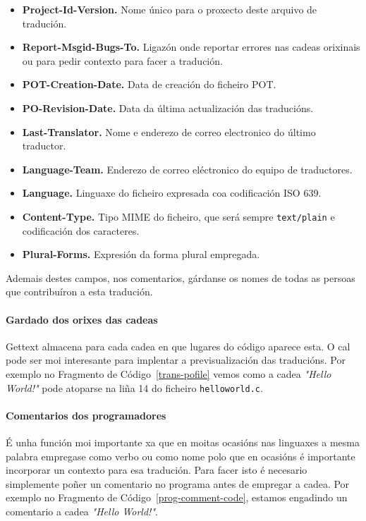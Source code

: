 \begin{itemize}
    \item \textbf{Project-Id-Version.} Nome único para o proxecto deste arquivo de tradución.
    \item \textbf{Report-Msgid-Bugs-To.} Ligazón onde reportar errores nas cadeas orixinais ou para pedir contexto para facer a tradución.
    \item \textbf{POT-Creation-Date.} Data de creación do ficheiro POT.
    \item \textbf{PO-Revision-Date.} Data da última actualización das traducións.
    \item \textbf{Last-Translator.} Nome e enderezo de correo electronico do último traductor.
    \item \textbf{Language-Team.} Enderezo de correo eléctronico do equipo de traductores.
    \item \textbf{Language.} Linguaxe do ficheiro expresada coa codificación ISO 639.
    \item \textbf{Content-Type.} Tipo MIME do ficheiro, que será sempre \lstinline{text/plain} e codificación dos caracteres.
    \item \textbf{Plural-Forms.} Expresión da forma plural empregada.
\end{itemize}

Ademais destes campos, nos comentarios, gárdanse os nomes de todas as persoas que contribuíron a esta tradución.

\paragraph{Gardado dos orixes das cadeas}
Gettext almacena para cada cadea en que lugares do código aparece esta. O cal pode ser moi interesante para implentar a previsualización das traducións. Por exemplo no Fragmento de Código~\ref{trans-pofile} vemos como a cadea \emph{"Hello World!"} pode atoparse na liña 14 do ficheiro \lstinline{helloworld.c}.

\paragraph{Comentarios dos programadores}
É unha función moi importante xa que en moitas ocasións nas linguaxes a mesma palabra empregase como verbo ou como nome polo que en ocasións é importante incorporar un contexto para esa tradución. Para facer isto é necesario simplemente poñer un comentario no programa antes de empregar a cadea. Por exemplo no Fragmento de Código~\ref{prog-comment-code}, estamos engadindo un comentario a cadea \emph{"Hello World!"}.

